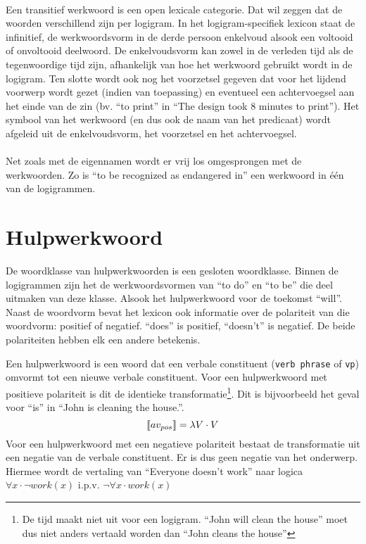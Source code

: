 \paragraph{}Een transitief werkwoord is een open lexicale categorie. Dat wil zeggen dat de woorden verschillend zijn per logigram. In het logigram-specifiek lexicon staat de infinitief, de werkwoordsvorm in de derde persoon enkelvoud alsook een voltooid of onvoltooid deelwoord. De enkelvoudsvorm kan zowel in de verleden tijd als de tegenwoordige tijd zijn, afhankelijk van hoe het werkwoord gebruikt wordt in de logigram. Ten slotte wordt ook nog het voorzetsel gegeven dat voor het lijdend voorwerp wordt gezet (indien van toepassing) en eventueel een achtervoegsel aan het einde van de zin (bv. ``to print'' in ``The design took 8 minutes to print''). Het symbool van het werkwoord (en dus ook de naam van het predicaat) wordt afgeleid uit de enkelvoudsvorm, het voorzetsel en het achtervoegsel.

\paragraph{} Net zoals met de eigennamen wordt er vrij los omgesprongen met de werkwoorden. Zo is ``to be recognized as endangered in'' een werkwoord in één van de logigrammen.

\section{Hulpwerkwoord}
De woordklasse van hulpwerkwoorden is een gesloten woordklasse. Binnen de logigrammen zijn het de werkwoordsvormen van ``to do'' en ``to be'' die deel uitmaken van deze klasse. Alsook het hulpwerkwoord voor de toekomst ``will''. Naast de woordvorm bevat het lexicon ook informatie over de polariteit van die woordvorm: positief of negatief. ``does'' is positief, ``doesn't'' is negatief. De beide polariteiten hebben elk een andere betekenis.

Een hulpwerkwoord is een woord dat een verbale constituent (\texttt{verb phrase} of \texttt{vp}) omvormt tot een nieuwe verbale constituent. Voor een hulpwerkwoord met positieve polariteit is dit de identieke transformatie\footnote{De tijd maakt niet uit voor een logigram. ``John will clean the house'' moet dus niet anders vertaald worden dan ``John cleans the house''}. Dit is bijvoorbeeld het geval voor ``is'' in ``John is cleaning the house.''. $$\llbracket av_{pos}\rrbracket = \lambda V \cdot V$$ Voor een hulpwerkwoord met een negatieve polariteit bestaat de transformatie uit een negatie van de verbale constituent. Er is dus geen negatie van het onderwerp. Hiermee wordt de vertaling van ``Everyone doesn't work'' naar logica $\forall x \cdot \lnot work(x)$ i.p.v. $\lnot \forall x \cdot work(x)$

